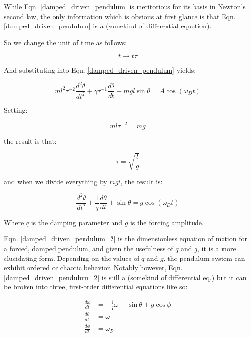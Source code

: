 \documentclass[aps,pre,nofootinbib]{revtex4}
\begin{document}
While Eqn. \eqref{damped_driven_pendulum} is meritorious for its basis in Newton's second law, the only information which is obvious at first glance is that  Eqn. \eqref{damped_driven_pendulum} is a (somekind of differential equation).  

So we change the unit of time as follows:

 \begin{equation*}
\label{change_time_units}
t \rightarrow t \tau
\end{equation*}

And substituting into Eqn. \eqref{damped_driven_pendulum} yields:

\begin{equation*}
\label{damped_driven_pendulum_1}
ml^2 \tau^{-2} \frac{d^2\theta}{dt^2} + \gamma \tau^{-1} \frac{d \theta}{dt} + mgl \sin{\theta} = A \cos{(\omega_D t)}
\end{equation*}

Setting:

\begin{equation*}
\label{intermediary_1}
ml \tau^{-2} = mg
\end{equation*}

the result is that:

\begin{equation*}
\label{intermediary_2}
\tau = \sqrt{\frac{l}{g}}
\end{equation*}

and when we divide everything by $mgl$, the result is:

\begin{equation}
\label{damped_driven_pendulum_2}
\frac{d^2\theta}{dt^2} + \frac{1}{q} \frac{d \theta}{dt} + \sin{\theta} = g \cos{(\omega_D t)}
\end{equation}

Where $q$ is the damping parameter and $g$ is the forcing amplitude.

Eqn. \eqref{damped_driven_pendulum_2} is the dimensionless equation of motion for a forced, damped pendulum, and given the usefulness of $q$ and $g$, it is a more elucidating form.  Depending on the values of $q$ and $g$, the pendulum system can exhibit ordered or chaotic behavior.  Notably however, Eqn. \eqref{damped_driven_pendulum_2} is still a (somekind of differential eq.) but it can be broken into three, first-order differential equations like so:

\begin{align}
\label{first_order_eqns}
\frac{d\omega}{dt} & = -\frac{1}{q}\omega-\sin{\theta}+g\cos{\phi} \\
\frac{d\theta}{dt} & =\omega \\
\frac{d\phi}{dt} & =\omega_D
\end{align}
\end{document}
